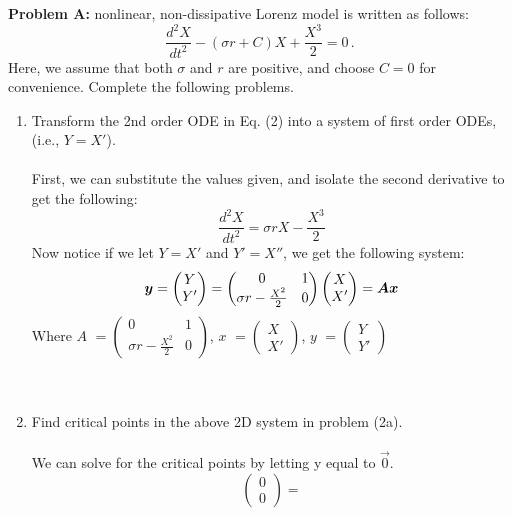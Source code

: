 \documentclass[11pt]{article}
\newcommand{\bmath}[1]{\boldmath#1\unboldmath}
\newcommand{\bmathIT}[1]{\text{\boldmath#1\unboldmath}}
\newenvironment{problem}[1]{\textbf{Problem #1: }}{\newpage}
\begin{document}
	\begin{problem}{2}
		A nonlinear, non-dissipative Lorenz model is written as follows:
		\[\frac{d^2X}{dt^2} - (\sigma r  + C)X + \frac{X^3}{2} = 0\,.\tag{2}\]
		Here, we assume that both $\sigma$ and $r$ are positive, and choose $C = 0$ for convenience. Complete the following problems.
		\begin{enumerate}[label = (\alph*)]
			\item Transform the 2nd order ODE in Eq. (2) into a system of first order ODEs, (i.e., $Y = X'$).
			\\ \\
			First, we can substitute the values given, and isolate the second derivative to get the following:
			\[\frac{d^2X}{dt^2} = \sigma rX - \frac{X^3}{2}\]
			Now notice if we let $Y = X'$ and $Y' = X''$, we get the following system:
			\[
			\bmathIT{$y$} = 
			\begin{pmatrix}
				Y \\ Y'
			\end{pmatrix} =
			\begin{pmatrix}
				0 & 1 \\
				\sigma r - \frac{X^2}{2} & 0
			\end{pmatrix}
			\begin{pmatrix}
				X \\ X'
			\end{pmatrix} =  \bmathIT{$Ax$}
			\]
			Where \bmath{$A$} $= \begin{pmatrix}
			0 & 1 \\
			\sigma r - \frac{X^2}{2} & 0
			\end{pmatrix}$, \bmath{$x$} $= \begin{pmatrix}
			X \\ X'
			\end{pmatrix}$, \bmath{$y$} $=\begin{pmatrix}
			Y \\ Y'
			\end{pmatrix}$
			\\ \\ \\
			\item Find critical points in the above 2D system in problem (2a).
			\\ \\
			We can solve for the critical points by letting \bmath{y} equal to \bmath{$\vec{0}$}.
			\[
			\begin{pmatrix}
				0 \\ 0
			\end{pmatrix} = 
\]
\end{enumerate}
\end{problem}
\end{document}
